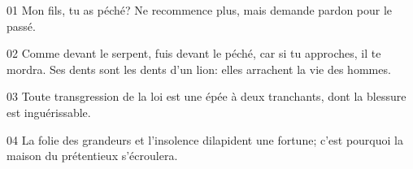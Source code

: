 01 Mon fils, tu as péché? Ne recommence plus, mais demande pardon pour le passé.

02 Comme devant le serpent, fuis devant le péché, car si tu approches, il te mordra. Ses dents sont les dents d’un lion: elles arrachent la vie des hommes.

03 Toute transgression de la loi est une épée à deux tranchants, dont la blessure est inguérissable.

04 La folie des grandeurs et l’insolence dilapident une fortune; c’est pourquoi la maison du prétentieux s’écroulera.
